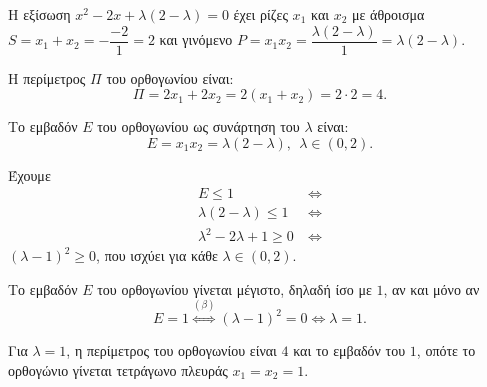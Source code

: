 
\begin{alist}
\item Η εξίσωση $x^2 - 2x + \lambda(2 - \lambda) = 0$ έχει ρίζες $x_1$ και $x_2$ με άθροισμα $S = x_1 + x_2 = -\dfrac{-2}{1} = 2$
και γινόμενο $P = x_1 x_2 = \dfrac{\lambda(2 - \lambda)}{1} = \lambda(2 - \lambda)$.
\begin{rlist}
\item Η περίμετρος $\Pi$ του ορθογωνίου είναι: 
\[\Pi = 2x_1 + 2x_2 = 2(x_1 + x_2) = 2 \cdot 2 = 4.\]

\item Το εμβαδόν $E$ του ορθογωνίου ως συνάρτηση του $\lambda$ είναι:
\[E = x_1 x_2 = \lambda(2 - \lambda), \ \ \lambda \in (0, 2).\]
\end{rlist}

\item Έχουμε
\begin{align*}
E \le 1 \ &\Leftrightarrow \\
\lambda(2 - \lambda) \le 1 \ &\Leftrightarrow \\
\lambda^2 - 2\lambda + 1 \ge 0 \ &\Leftrightarrow
\end{align*}
$(\lambda - 1)^2 \ge 0$, που ισχύει για κάθε $\lambda \in (0, 2)$.

\item Το εμβαδόν $E$ του ορθογωνίου γίνεται μέγιστο, δηλαδή ίσο με $1$, αν και μόνο αν
\[E = 1 \stackrel{(\beta)}{\Leftrightarrow} (\lambda - 1)^2 = 0 \Leftrightarrow \lambda = 1.\]

Για $\lambda = 1$, η περίμετρος του ορθογωνίου είναι $4$ και το εμβαδόν του $1$, οπότε το ορθογώνιο
γίνεται τετράγωνο πλευράς $x_1 = x_2 = 1$.
\end{alist}

